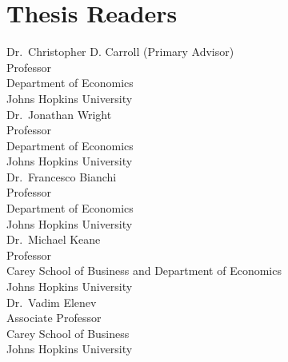 %
\lipsum[1-4]
%
\section*{Thesis Readers}
\begin{singlespace}
%
\noindent Dr.~Christopher D. Carroll (Primary Advisor)\\
\indent \indent Professor\\
\indent \indent Department of Economics\\
\indent \indent Johns Hopkins University\\

\noindent Dr.~Jonathan Wright\\
\indent \indent Professor\\
\indent \indent Department of Economics\\
\indent \indent Johns Hopkins University\\

\noindent Dr.~Francesco Bianchi\\
\indent \indent Professor\\
\indent \indent Department of Economics\\
\indent \indent Johns Hopkins University\\

\noindent Dr.~Michael Keane\\
\indent \indent Professor\\
\indent \indent Carey School of Business and Department of Economics\\
\indent \indent Johns Hopkins University\\

\noindent Dr.~Vadim Elenev\\
\indent \indent Associate Professor\\
\indent \indent Carey School of Business\\
\indent \indent Johns Hopkins University\\
%
%
\end{singlespace}